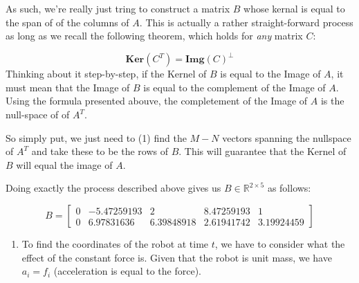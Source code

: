 \documentclass[12pt]{exam}
\newcommand{\Q}[1]{\question{\large{\textbf{#1}}}}
\begin{document}
\begin{questions}
\begin{solution}
    As such, we're really just tring to construct a matrix $B$ whose kernal is equal to the span of of the columns of $A$. This is actually a rather straight-forward process as long as we recall the following theorem, which holds for \textit{any} matrix $C$:

    \[
      \textbf{Ker}(C^T) = \textbf{Img}(C)^{\perp}
    \]
    Thinking about it step-by-step, if the Kernel of $B$ is equal to the Image of $A$, it must mean that the Image of $B$ is equal to the complement of the Image of $A$. Using the formula presented abouve, the completement of the Image of $A$ is the null-space of of $A^T$.

    So simply put, we just need to (1) find the $M-N$ vectors spanning the nullspace of $A^T$ and take these to be the rows of $B$. This will guarantee that the Kernel of $B$ will equal the image of $A$.

    Doing exactly the process described above gives us $B \in \mathbb{R}^{2 \times 5}$ as follows:

    \[
      B =
        \begin{bmatrix}
          0 & -5.47259193 &  2 &  8.47259193 & 1 \\
          0 & 6.97831636 & 6.39848918 & 2.61941742 & 3.19924459
        \end{bmatrix}
    \]


  \end{solution}

\newpage
\Q{Coin Collector Robot}
  \begin{solution}
    \begin{enumerate}[label=(\alph*)]
      \item To find the coordinates of the robot at time $t$, we have to consider what the effect of the constant force is. Given that the robot is unit mass, we have $a_i = f_i$ (acceleration is equal to the force).


\end{enumerate}
\end{solution}
\end{questions}
\end{document}
